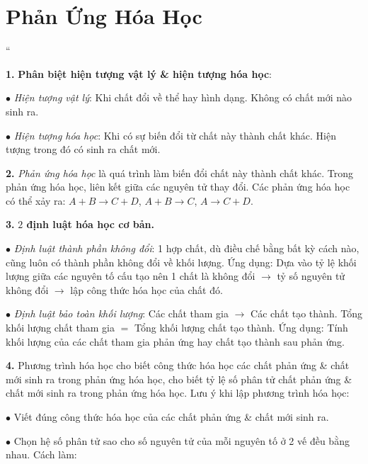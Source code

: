 \documentclass{article}
\numberwithin{equation}{section}
\begin{document}
\section{Phản Ứng Hóa Học}
``\begin{enumerate*}
	\item[\textbf{1.}] \textbf{Phân biệt hiện tượng vật lý \& hiện tượng hóa học}:
	\begin{enumerate*}
		\item[$\bullet$] \textit{Hiện tượng vật lý}: Khi chất đổi về thể hay hình dạng. Không có chất mới nào sinh ra.
		\item[$\bullet$] \textit{Hiện tượng hóa học}: Khi có sự biến đổi từ chất này thành chất khác. Hiện tượng trong đó có sinh ra chất mới.
	\end{enumerate*}
	\item[\textbf{2.}] \textit{Phản ứng hóa học} là quá trình làm biến đổi chất này thành chất khác. Trong phản ứng hóa học, liên kết giữa các nguyên tử thay đổi. Các phản ứng hóa học có thể xảy ra: $A + B\to C + D$, $A + B\to C$, $A\to C + D$.
	\item[\textbf{3.}] \textbf{$2$ định luật hóa học cơ bản.}
	\begin{enumerate*}
		\item[$\bullet$] \textit{Định luật thành phần không đổi}: 1 hợp chất, dù điều chế bằng bất kỳ cách nào, cũng luôn có thành phần không đổi về khối lượng. Ứng dụng: Dựa vào tỷ lệ khối lượng giữa các nguyên tố cấu tạo nên 1 chất là không đổi $\to$ tỷ số nguyên tử không đổi $\to$ lập công thức hóa học của chất đó.
		\item[$\bullet$] \textit{Định luật bảo toàn khối lượng}: Các chất tham gia $\to$ Các chất tạo thành. Tổng khối lượng chất tham gia $=$ Tổng khối lượng chất tạo thành. Ứng dụng: Tính khối lượng của các chất tham gia phản ứng hay chất tạo thành sau phản ứng.
	\end{enumerate*}
	\item[\textbf{4.}] Phương trình hóa học cho biết công thức hóa học các chất phản ứng \& chất mới sinh ra trong phản ứng hóa học, cho biết tỷ lệ số phân tử chất phản ứng \& chất mới sinh ra trong phản ứng hóa học. Lưu ý khi lập phương trình hóa học:
	\begin{enumerate*}
		\item[$\bullet$] Viết đúng công thức hóa học của các chất phản ứng \& chất mới sinh ra.
		\item[$\bullet$] Chọn hệ số phân tử sao cho số nguyên tử của mỗi nguyên tố ở 2 vế đều bằng nhau. Cách làm:
		\begin{enumerate*}

\end{enumerate*}
\end{enumerate*}
\end{enumerate*}
\end{document}
